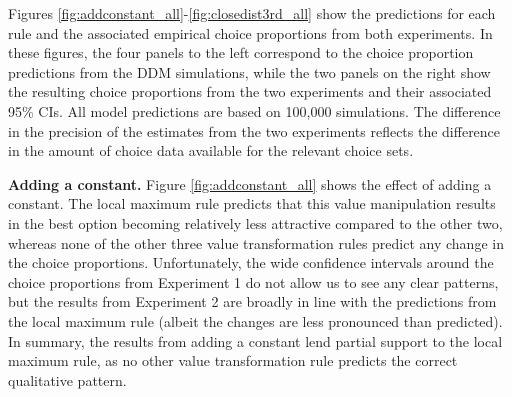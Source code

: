 \documentclass[11pt,a4paper]{article}
\begin{document}



Figures \ref{fig:addconstant_all}-\ref{fig:closedist3rd_all} show the predictions for each rule and the associated empirical choice proportions from both experiments. In these figures, the four panels to the left correspond to the choice proportion predictions from the DDM simulations, while the two panels on the right show the resulting choice proportions from the two experiments and their associated 95\% CIs. All model predictions are based on 100,000 simulations. The difference in the precision of the estimates from the two experiments reflects the difference in the amount of choice data available for the relevant choice sets.  




\textbf{Adding a constant.} Figure \ref{fig:addconstant_all} shows the effect of adding a constant. The local maximum rule predicts that this value manipulation results in the best option becoming relatively less attractive compared to the other two, whereas none of the other three value transformation rules predict any change in the choice proportions. Unfortunately, the wide confidence intervals around the choice proportions from Experiment 1 do not allow us to see any clear patterns, but the results from Experiment 2 are broadly in line with the predictions from the local maximum rule (albeit the changes are less pronounced than predicted). In summary, the results from adding a constant lend partial support to the local maximum rule, as no other value transformation rule predicts the correct qualitative pattern.  
\end{document}
